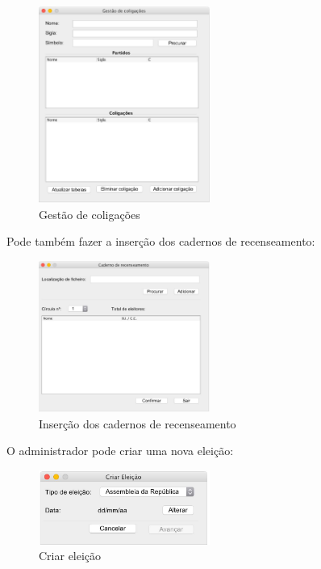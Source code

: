 \documentclass[a4paper,12pt]{report}
\begin{document}
\begin{figure}[H]
\begin{center}
	\includegraphics[width=0.5\textwidth]{media/img_interface/img4.jpg}
	 \caption{Gestão de coligações}
\end{center}
\end{figure}
Pode também fazer a inserção dos cadernos de recenseamento:
\begin{figure}[H]
\begin{center}
	\includegraphics[width=0.5\textwidth]{media/img_interface/img8.jpg}
	 \caption{Inserção dos cadernos de recenseamento}
\end{center}
\end{figure}
O administrador pode criar uma nova eleição:
\begin{figure}[H]
\begin{center}
	\includegraphics[width=0.5\textwidth]{media/img_interface/img1.jpg}
	 \caption{Criar eleição}
\end{center}
\end{figure}
\end{document}
